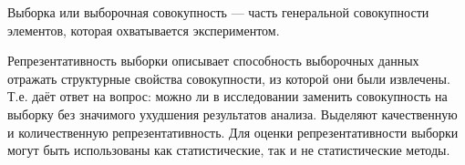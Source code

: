 Выборка или выборочная совокупность — часть генеральной совокупности элементов, которая охватывается экспериментом.

Репрезентативность выборки описывает способность выборочных данных отражать структурные свойства совокупности, из которой они были извлечены. Т.е. даёт ответ на вопрос: можно ли в исследовании заменить совокупность на выборку без значимого ухудшения результатов анализа.
Выделяют качественную и количественную репрезентативность.
Для оценки репрезентативности выборки могут быть использованы как статистические,
так и не статистические методы.
